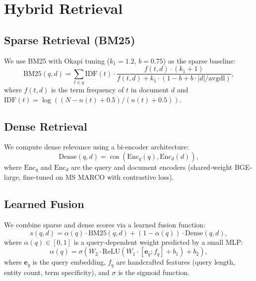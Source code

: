 \section{Hybrid Retrieval}

\label{sec:retrieval}

\subsection{Sparse Retrieval (BM25)}

We use BM25 with Okapi tuning ($k_1 = 1.2$, $b = 0.75$) as the sparse baseline:
\begin{equation}
\text{BM25}(q, d) = \sum_{t \in q} \text{IDF}(t) \cdot \frac{f(t, d) \cdot (k_1 + 1)}{f(t, d) + k_1 \cdot (1 - b + b \cdot |d| / \text{avgdl})},
\end{equation}
where $f(t, d)$ is the term frequency of $t$ in document $d$ and $\text{IDF}(t) = \log((N - n(t) + 0.5) / (n(t) + 0.5))$.

\subsection{Dense Retrieval}

We compute dense relevance using a bi-encoder architecture:
\begin{equation}
\text{Dense}(q, d) = \cos(\text{Enc}_q(q), \text{Enc}_d(d)),
\end{equation}
where $\text{Enc}_q$ and $\text{Enc}_d$ are the query and document encoders (shared-weight BGE-large, fine-tuned on MS MARCO with contrastive loss).

\subsection{Learned Fusion}

We combine sparse and dense scores via a learned fusion function:
\begin{equation}
s(q, d) = \alpha(q) \cdot \text{BM25}(q, d) + (1 - \alpha(q)) \cdot \text{Dense}(q, d),
\end{equation}
where $\alpha(q) \in [0, 1]$ is a query-dependent weight predicted by a small MLP:
\begin{equation}
\alpha(q) = \sigma(W_2 \cdot \text{ReLU}(W_1 \cdot [\bm{e}_q; f_q] + b_1) + b_2),
\end{equation}
where $\bm{e}_q$ is the query embedding, $f_q$ are handcrafted features (query length, entity count, term specificity), and $\sigma$ is the sigmoid function.

